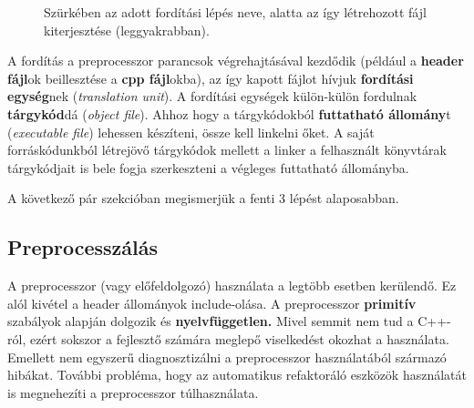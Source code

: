 \documentclass[a4paper,11.5pt,table]{article}
\begin{document}
\begin{figure}[!h]
		\smallskip
		
		Szürkében az adott fordítási lépés neve, alatta az így létrehozott fájl kiterjesztése (leggyakrabban).
	\end{figure}
	A fordítás a preprocesszor parancsok végrehajtásával kezdődik (például a \textbf{header fájl}ok beillesztése a \textbf{cpp fájl}okba), az így kapott fájlot hívjuk \textbf{fordítási egység}nek (\textit{translation unit}). A fordítási egységek külön-külön fordulnak \textbf{tárgykód}dá (\textit{object file}). Ahhoz hogy a tárgykódokból \textbf{futtatható állomány}t (\textit{executable file}) lehessen készíteni, össze kell linkelni őket. A saját forráskódunkból létrejövő tárgykódok mellett a linker a felhasznált könyvtárak tárgykódjait is bele fogja szerkeszteni a végleges futtatható állományba.
	\medskip
	
	A következő pár szekcióban megismerjük a fenti 3 lépést alaposabban.
	
	\subsection{Preprocesszálás}
	A preprocesszor (vagy előfeldolgozó) használata a legtöbb esetben kerülendő. Ez alól kivétel a header állományok include-olása. A preprocesszor \textbf{primitív} szabályok alapján dolgozik és \textbf{nyelvfüggetlen.} Mivel semmit nem tud a C++-ról, ezért sokszor a fejlesztő számára meglepő viselkedést okozhat a használata. Emellett nem egyszerű diagnosztizálni a preprocesszor használatából származó hibákat. További probléma, hogy az automatikus refaktoráló eszközök használatát is megnehezíti a preprocesszor túlhasználata.
	
\end{document}
